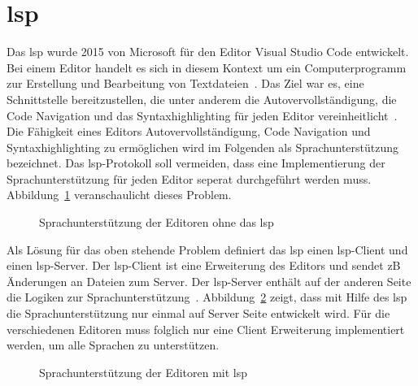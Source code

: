 \section{\acs{lsp}}

Das \ac{lsp} wurde 2015 von Microsoft für den Editor Visual Studio Code entwickelt.
Bei einem Editor handelt es sich in diesem Kontext um ein Computerprogramm zur Erstellung und Bearbeitung von Textdateien~\cite{editor-definition}.
Das Ziel war es, eine Schnittstelle bereitzustellen, die unter anderem die Autovervollständigung, die Code Navigation und das Syntaxhighlighting
für jeden Editor vereinheitlicht~\cite{lsp-witekio}.
Die Fähigkeit eines Editors Autovervollständigung, Code Navigation und Syntaxhighlighting zu ermöglichen wird im Folgenden als Sprachunterstützung bezeichnet.
Das \ac{lsp}-Protokoll soll vermeiden, dass eine Implementierung der Sprachunterstützung für jeden Editor seperat durchgeführt werden muss.
Abbildung~\ref{fig:without-lsp} veranschaulicht dieses Problem.

\begin{figure}[htp] %
      \centering
      \caption{Sprachunterstützung der Editoren ohne das \acs{lsp}}
      \label{fig:without-lsp}
\end{figure}

Als Lösung für das oben stehende Problem definiert das \ac{lsp} einen \ac{lsp}-Client und einen \ac{lsp}-Server.
Der \ac{lsp}-Client ist eine Erweiterung des Editors und sendet \ac{zB} Änderungen an Dateien zum Server.
Der \ac{lsp}-Server enthält auf der anderen Seite die Logiken zur Sprachunterstützung~\cite{lsp-witekio}.
Abbildung~\ref{fig:with-lsp} zeigt, dass mit Hilfe des \ac{lsp} die Sprachunterstützung nur einmal auf Server Seite entwickelt wird.
Für die verschiedenen Editoren muss folglich nur eine Client Erweiterung implementiert werden, um alle Sprachen zu unterstützen.

\begin{figure}[htp] %
      \centering
      \caption{Sprachunterstützung der Editoren mit \acs{lsp}}
      \label{fig:with-lsp}
\end{figure}

